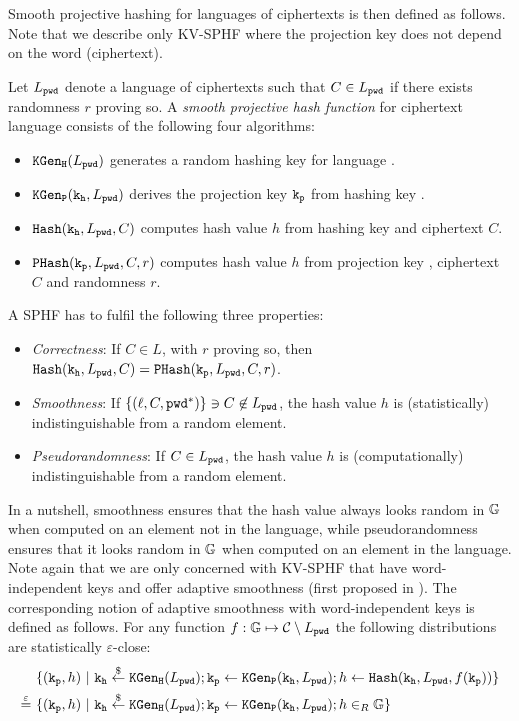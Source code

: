\noindent
Smooth projective hashing for languages of ciphertexts is then defined as follows.
Note that we describe only KV-SPHF where the projection key does not depend on the word (ciphertext).

\begin{definition}[KV-SPHF]\label{def:sphf}
Let $L_\mathtt{pwd}$ denote a language of ciphertexts such that $C\in L_\mathtt{pwd}$ if there exists randomness $r$ proving so.
A \emph{smooth projective hash function} for ciphertext language \Lpwd consists of the following four algorithms:

\begin{itemize}
	\item $\mathtt{KGen_H}(L_\mathtt{pwd})$ generates a random hashing key \hk for language \Lpwd.
	\item $\mathtt{KGen_P}(\mathtt{k_h},L_\mathtt{pwd})$ derives the projection key $\mathtt{k_p}$ from hashing key \hk. 
	\item $\mathtt{Hash}(\mathtt{k_h},L_\mathtt{pwd},C)$ computes hash value $h$ from hashing key \hk and ciphertext $C$.
	\item $\mathtt{PHash}(\mathtt{k_p},L_\mathtt{pwd},C,r)$ computes hash value $h$ from projection key \hp, ciphertext $C$ and randomness $r$. 
\end{itemize}
\end{definition}

\noindent
A SPHF has to fulfil the following three properties:
\begin{itemize}
	\item \emph{Correctness}: If $C\in L$, with $r$ proving so, then $\mathtt{Hash}(\mathtt{k_h},L_\mathtt{pwd},C)=\mathtt{PHash}(\mathtt{k_p},L_\mathtt{pwd},C,r)$.
	\item \emph{Smoothness}: If $\{(\ell, C, \mathtt{pwd}^\ast)\}\ni C\not\in L_\mathtt{pwd}$, the hash value $h$ is (statistically) indistinguishable from a random element. 
	\item \emph{Pseudorandomness}: If $C\in L_\mathtt{pwd}$, the hash value $h$ is (computationally) indistinguishable from a random element. 
\end{itemize}

\noindent
In a nutshell, smoothness ensures that the hash value always looks random in $\mathbb{G}$ when computed on an element not in the language, while pseudorandomness ensures that it looks random in $\mathbb{G}$ when computed on an element in the language.
Note again that we are only concerned with KV-SPHF that have word-independent keys and offer adaptive smoothness (first proposed in \cite{Katz2011}).
The corresponding notion of adaptive smoothness with word-independent keys is defined as follows.
For any function $f:\mathbb{G} \mapsto \mathcal{C}\setminus L_\mathtt{pwd}$ the following distributions are statistically $\varepsilon$-close:
\begin{align*}
& \{(\mathtt{k_p},h) ~|~ \mathtt{k_h}\stackrel{\$}{\gets}\mathtt{KGen_H}(L_\mathtt{pwd}); \mathtt{k_p}\gets\mathtt{KGen_P}(\mathtt{k_h},L_\mathtt{pwd}); h\gets\mathtt{Hash}(\mathtt{k_h},L_\mathtt{pwd},f(\mathtt{k_p}))\} \\
\stackrel{\varepsilon}{=}~ & \{(\mathtt{k_p},h) ~|~ \mathtt{k_h}\stackrel{\$}{\gets}\mathtt{KGen_H}(L_\mathtt{pwd}); \mathtt{k_p}\gets\mathtt{KGen_P}(\mathtt{k_h},L_\mathtt{pwd}); h\in_R\mathbb{G}\}
\end{align*}

